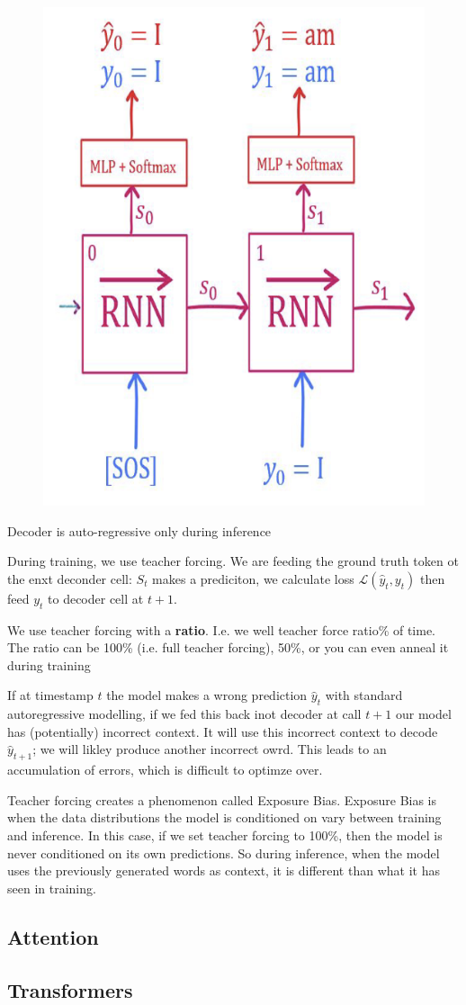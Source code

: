 \documentclass[11pt]{article}
\begin{document}
\begin{figure}[H]
    \centering
    \includegraphics[width=.3\linewidth]{figures/teacher-forcing.png}
\end{figure}

Decoder is auto-regressive only during inference

During training, we use teacher forcing. We are feeding the ground truth token ot the enxt deconder cell: $S_t$ makes a prediciton, we calculate loss $\mathcal L (\hat y_t, y_t)$ then feed $y_t$ to decoder cell at $t+1$.

We use teacher forcing with a \textbf{ratio}. I.e. we well teacher force
ratio\% of time. The ratio can be 100\% (i.e. full teacher forcing), 50\%, or you
can even anneal it during training

If at timestamp $t$ the model makes a wrong prediction $\hat y_t$ with standard autoregressive modelling, if we fed this back inot decoder at call $t+1$ our model has (potentially) incorrect context. It will use this incorrect context to decode $\hat y_{t+1}$; we will likley produce another incorrect owrd. This leads to an accumulation of errors, which is difficult to optimze over.

Teacher forcing creates a phenomenon called Exposure Bias.
Exposure Bias is when the data distributions the model is conditioned on vary between training and inference. In this case, if we set teacher forcing to 100\%, then the model is never conditioned on its own predictions. So during inference, when the model uses the previously generated words as context, it is different than what it has seen in training.

\subsection{Attention}

\subsection{Transformers}
\end{document}
